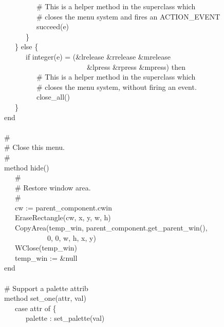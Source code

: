 {\>   \ \ \ \ \ \ \ \ \ \# This is a helper method in the superclass which \\
\>   \ \ \ \ \ \ \ \ \ \# closes the menu system and fires an ACTION\_EVENT \\
\>   \ \ \ \ \ \ \ \ \ succeed(e) \\
\>   \ \ \ \ \ \ \} \\
\>   \ \ \ \} else \{ \\
\>   \ \ \ \ \ \ if integer(e) = (\&lrelease {\textbar} \&rrelease
{\textbar} \&mrelease {\textbar} \\
\>   \ \ \ \ \ \ \ \ \ \ \ \ \ \ \ \ \ \ \ \ \ \ \ \&lpress {\textbar}
\&rpress {\textbar} \&mpress) then \\
\>   \ \ \ \ \ \ \ \ \ \# This is a helper method in the superclass
which \\
\>   \ \ \ \ \ \ \ \ \ \# closes the menu system, without firing an
event. \\
\>   \ \ \ \ \ \ \ \ \ close\_all() \\
\>   \ \ \ \} \\
\>   end \\
\ \\
\>   \# \\
\>   \# Close this menu. \\
\>   \# \\
\>   method hide() \\
\>   \ \ \ \# \\
\>   \ \ \ \# Restore window area. \\
\>   \ \ \ \# \\
\>   \ \ \ cw := parent\_component.cwin \\
\>   \ \ \ EraseRectangle(cw, x, y, w, h) \\
\>   \ \ \ CopyArea(temp\_win,
parent\_component.get\_parent\_win(), \\
\>   \ \ \ \ \ \ \ \ \ \ \ \ 0, 0, w, h, x, y) \\
\>   \ \ \ WClose(temp\_win) \\
\>   \ \ \ temp\_win := \&null \\
\>   end \\
\ \\
\>   \# Support a {\textquotedbl}palette{\textquotedbl} attrib \\
\>   method set\_one(attr, val) \\
\>   \ \ \ case attr of \{ \\
\>   \ \ \ \ \ \ {\textquotedbl}palette{\textquotedbl} :
set\_palette(val) \\
}
